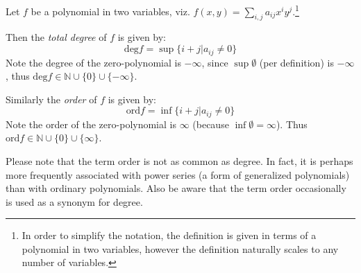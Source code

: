 \documentclass[12pt]{article}
\begin{document}
Let $f$ be a polynomial in two variables, viz. $f(x,y) = \sum_{i,j} a_{ij}x^i y^j$.\footnote
{In order to simplify the notation, the definition is given in terms of a polynomial in two variables, however the definition naturally scales to any number of variables.}

 Then the \emph{total degree} of $f$ is given by:
\[
\mathrm{deg} f = \sup\{i+j | a_{ij} \neq 0\}
\]
Note the degree of the zero-polynomial is $-\infty$, since $\sup\emptyset$ (per definition) is $-\infty$, thus $\mathrm{deg} f \in \mathbb{N}\cup\{0\}\cup\{-\infty\}$.

Similarly the \emph{order} of $f$ is given by:
\[
\mathrm{ord} f = \inf\{i+j | a_{ij} \neq 0\}
\]
Note the order of the zero-polynomial is $\infty$ (because $\inf\emptyset = \infty$). Thus $\mathrm{ord} f \in \mathbb{N}\cup\{0\}\cup\{\infty\}$.

Please note that the term order is not as common as degree. In fact, it is perhaps more frequently associated with power series (a form of generalized polynomials) than with ordinary polynomials. Also be aware that the term order occasionally is used as a synonym for degree.
\end{document}
